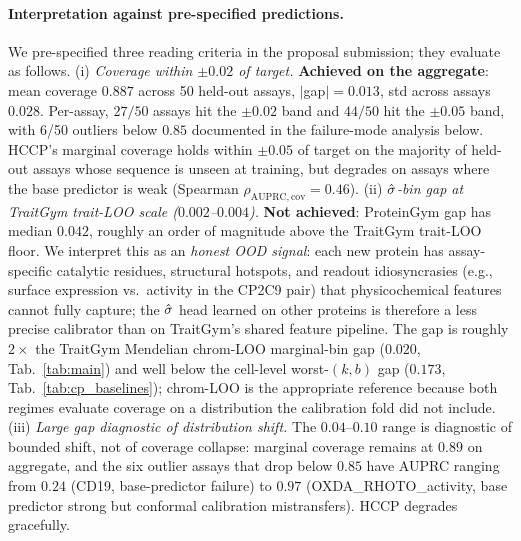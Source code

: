 \paragraph{Interpretation against pre-specified predictions.}
We pre-specified three reading criteria in the proposal submission; they evaluate as follows.
(i) \emph{Coverage within $\pm 0.02$ of target.} \textbf{Achieved on the aggregate}: mean coverage $0.887$ across 50 held-out assays, $|$gap$|= 0.013$, std across assays $0.028$. Per-assay, $27/50$ assays hit the $\pm 0.02$ band and $44/50$ hit the $\pm 0.05$ band, with 6/50 outliers below $0.85$ documented in the failure-mode analysis below. HCCP's marginal coverage holds within $\pm 0.05$ of target on the majority of held-out assays whose sequence is unseen at training, but degrades on assays where the base predictor is weak (Spearman $\rho_{\mathrm{AUPRC, cov}} = 0.46$).
(ii) \emph{$\hat{\sigma}$-bin gap at TraitGym trait-LOO scale ($0.002$--$0.004$).} \textbf{Not achieved}: ProteinGym gap has median $0.042$, roughly an order of magnitude above the TraitGym trait-LOO floor. We interpret this as an \emph{honest OOD signal}: each new protein has assay-specific catalytic residues, structural hotspots, and readout idiosyncrasies (e.g., surface expression vs.\ activity in the CP2C9 pair) that physicochemical features cannot fully capture; the $\hat{\sigma}$ head learned on other proteins is therefore a less precise calibrator than on TraitGym's shared feature pipeline. The gap is roughly $2\times$ the TraitGym Mendelian chrom-LOO marginal-bin gap ($0.020$, Tab.~\ref{tab:main}) and well below the cell-level worst-$(k,b)$ gap ($0.173$, Tab.~\ref{tab:cp_baselines}); chrom-LOO is the appropriate reference because both regimes evaluate coverage on a distribution the calibration fold did not include.
(iii) \emph{Large gap diagnostic of distribution shift.} The $0.04$--$0.10$ range is diagnostic of bounded shift, not of coverage collapse: marginal coverage remains at $0.89$ on aggregate, and the six outlier assays that drop below $0.85$ have AUPRC ranging from $0.24$ (CD19, base-predictor failure) to $0.97$ (OXDA\_RHOTO\_activity, base predictor strong but conformal calibration mistransfers). HCCP degrades gracefully.

